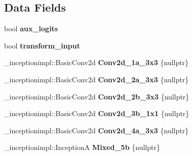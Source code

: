\subsection*{Data Fields}
\begin{DoxyCompactItemize}
\item 
\mbox{\label{structvision_1_1models_1_1InceptionV3Impl_a5abfe4e125d0e079db2218228a8c809f}} 
bool {\bfseries aux\+\_\+logits}
\item 
\mbox{\label{structvision_1_1models_1_1InceptionV3Impl_ad81ef5310b32240c02f394c9b241dc21}} 
bool {\bfseries transform\+\_\+input}
\item 
\mbox{\label{structvision_1_1models_1_1InceptionV3Impl_a4456cda3c13366aede9d877ada916718}} 
\+\_\+inceptionimpl\+::\+Basic\+Conv2d {\bfseries Conv2d\+\_\+1a\+\_\+3x3} \{nullptr\}
\item 
\mbox{\label{structvision_1_1models_1_1InceptionV3Impl_ae12d84d284a4ab362579a362930ea525}} 
\+\_\+inceptionimpl\+::\+Basic\+Conv2d {\bfseries Conv2d\+\_\+2a\+\_\+3x3} \{nullptr\}
\item 
\mbox{\label{structvision_1_1models_1_1InceptionV3Impl_af03e9e5fc4f8185890195186f973c073}} 
\+\_\+inceptionimpl\+::\+Basic\+Conv2d {\bfseries Conv2d\+\_\+2b\+\_\+3x3} \{nullptr\}
\item 
\mbox{\label{structvision_1_1models_1_1InceptionV3Impl_a11088abbcf06394dbf90f9ee47cf2d1f}} 
\+\_\+inceptionimpl\+::\+Basic\+Conv2d {\bfseries Conv2d\+\_\+3b\+\_\+1x1} \{nullptr\}
\item 
\mbox{\label{structvision_1_1models_1_1InceptionV3Impl_a464691e792cb021a51f803c767e5237e}} 
\+\_\+inceptionimpl\+::\+Basic\+Conv2d {\bfseries Conv2d\+\_\+4a\+\_\+3x3} \{nullptr\}
\item 
\mbox{\label{structvision_1_1models_1_1InceptionV3Impl_a8383b6be40602748eb95f9c99da4371f}} 
\+\_\+inceptionimpl\+::\+InceptionA {\bfseries Mixed\+\_\+5b} \{nullptr\}

\end{DoxyCompactItemize}
